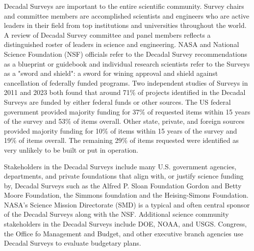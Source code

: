 \documentclass[preprint,12pt,doubleblind]{elsarticle}
\begin{document}
Decadal Surveys are important to the entire scientific community. Survey chairs and committee members are accomplished scientists and engineers who are active leaders in their field from top institutions and universities throughout the world. A review of Decadal Survey committee and panel members reflects a distinguished roster of leaders in science and engineering. NASA and National Science Foundation (NSF) officials refer to the Decadal Survey recommendations as a blueprint or guidebook and individual research scientists refer to the Surveys as a "sword and shield": a sword for wining approval and shield against cancellation of federally funded programs. Two independent studies of Surveys in 2011 \cite{Trimble2011} and 2023 \cite{pan2023seven_Decadals} both found that around 71\% of projects identified in the Decadal Surveys are funded by either federal funds or other sources. The US federal government provided majority funding for 37\% of requested items within 15 years of the survey and 53\% of items overall. Other state, private, and foreign sources provided majority funding for 10\% of items within 15 years of the survey and 19\% of items overall. The remaining 29\% of items requested were identified as very unlikely to be built or put in operation. 

Stakeholders in the Decadal Surveys include many U.S. government agencies, departments, and private foundations that align with, or justify science funding by, Decadal Surveys such as the Alfred P. Sloan Foundation\cite{Sloan2021_decadal_private_funding} Gordon and Betty Moore Foundation\cite{Moore2017_hera_decadal_priority}, the Simmons foundation and the Heising-Simons Foundation\cite{NSF2023_advanced_simons_observatory}. NASA's Science Mission Directorate (SMD) is a typical and often central sponsor of the Decadal Surveys along with the NSF. Additional science community stakeholders in the Decadal Surveys include DOE, NOAA, and USGS. Congress, the Office fo Management and Budget, and other executive branch agencies use Decadal Surveys to evaluate budgetary plans.
\end{document}
